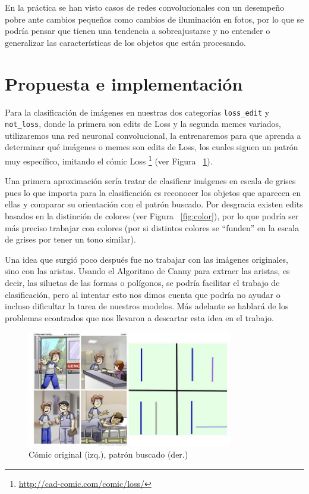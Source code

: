 \documentclass[spanish,11pt,letterpaper]{article}
\begin{document}
En la práctica se han visto casos de redes convolucionales con un desempeño pobre
ante cambios pequeños como cambios de iluminación en fotos, por lo que se podría
pensar que tienen una tendencia a sobreajustarse y no entender o generalizar las
características de los objetos que están procesando\cite{limitations}.

\section{Propuesta e implementación}

Para la clasificación de imágenes en nuestras dos categorías \texttt{loss\_edit}
y \texttt{not\_loss}, donde la primera son edits de Loss y la segunda memes
variados, utilizaremos una red neuronal convolucional, la entrenaremos para que
aprenda a determinar qué imágenes o memes son edits de Loss, los cuales siguen
un patrón muy específico, imitando el cómic Loss%
\footnote{\url{http://cad-comic.com/comic/loss/}} (ver Figura ~\ref{fig:loss}).

Una primera aproximación sería tratar de clasificar imágenes en escala de grises
pues lo que importa para la clasificación es reconocer los objetos que aparecen
en ellas y comparar su orientación con el patrón buscado. Por desgracia existen
edits basados en la distinción de colores (ver Figura ~\ref{fig:color}), por lo
que podría ser más preciso trabajar con colores (por si distintos colores se
``funden'' en la escala de grises por tener un tono similar).

Una idea que surgió poco después fue no trabajar con las imágenes originales, sino
con las aristas. Usando el Algoritmo de Canny para extraer las aristas, es decir,
las siluetas de las formas o polígonos, se podría facilitar el trabajo de
clasificación, pero al intentar esto nos dimos cuenta que podría no ayudar o
incluso dificultar la tarea de nuestros modelos. Más adelante se hablará de los problemas
econtrados que nos llevaron a descartar esta idea en el trabajo.

\begin{figure}[h]
\centering
\includegraphics[width=0.8\textwidth]{lossminimal}
\caption{Cómic original (izq.), patrón buscado (der.)}
\label{fig:loss}
\end{figure}
\end{document}

